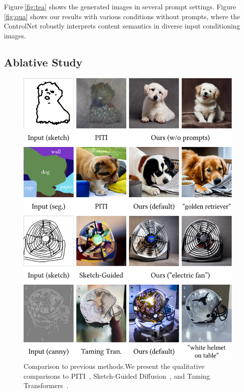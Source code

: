 \documentclass[10pt,twocolumn,letterpaper]{article}
\begin{document}
	
	Figure\,\ref{fig:tea} shows the generated images in several
	prompt settings. Figure\,\ref{fig:qua} shows our results with
	various conditions without prompts, where the
	ControlNet robustly interprets content semantics in
	diverse input conditioning images.
	
	\subsection{Ablative Study}
	
	\begin{figure}[!t]
		\centering
		\includegraphics[width=\linewidth]{./imgs/compa.pdf}
		\vspace{-20pt}
		\caption{Comparison to previous methods.We present the qualitative comparisons to PITI~\cite{wang2022pretraining}, Sketch-Guided Diffusion~\cite{voynov2022sketch}, and Taming Transformers~\cite{esser2021taming}.}
		\vspace{-10pt}
		\label{fig:compa}
	\end{figure}
	
\end{document}
